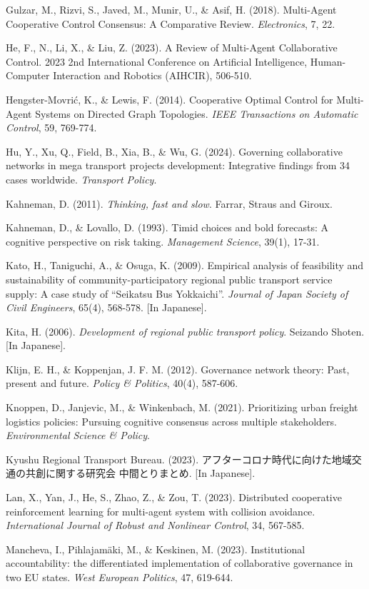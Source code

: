 Gulzar, M., Rizvi, S., Javed, M., Munir, U., \& Asif, H. (2018). Multi-Agent Cooperative Control Consensus: A Comparative Review. \emph{Electronics}, 7, 22.

He, F., N., Li, X., \& Liu, Z. (2023). A Review of Multi-Agent Collaborative Control. 2023 2nd International Conference on Artificial Intelligence, Human-Computer Interaction and Robotics (AIHCIR), 506-510.

Hengster-Movrić, K., \& Lewis, F. (2014). Cooperative Optimal Control for Multi-Agent Systems on Directed Graph Topologies. \emph{IEEE Transactions on Automatic Control}, 59, 769-774.

Hu, Y., Xu, Q., Field, B., Xia, B., \& Wu, G. (2024). Governing collaborative networks in mega transport projects development: Integrative findings from 34 cases worldwide. \emph{Transport Policy}.

Kahneman, D. (2011). \emph{Thinking, fast and slow}. Farrar, Straus and Giroux.

Kahneman, D., \& Lovallo, D. (1993). Timid choices and bold forecasts: A cognitive perspective on risk taking. \emph{Management Science}, 39(1), 17-31.

Kato, H., Taniguchi, A., \& Osuga, K. (2009). Empirical analysis of feasibility and sustainability of community-participatory regional public transport service supply: A case study of ``Seikatsu Bus Yokkaichi''. \emph{Journal of Japan Society of Civil Engineers}, 65(4), 568-578. {[}In Japanese{]}.

Kita, H. (2006). \emph{Development of regional public transport policy}. Seizando Shoten. {[}In Japanese{]}.

Klijn, E. H., \& Koppenjan, J. F. M. (2012). Governance network theory: Past, present and future. \emph{Policy \& Politics}, 40(4), 587-606.

Knoppen, D., Janjevic, M., \& Winkenbach, M. (2021). Prioritizing urban freight logistics policies: Pursuing cognitive consensus across multiple stakeholders. \emph{Environmental Science \& Policy}.

Kyushu Regional Transport Bureau. (2023). アフターコロナ時代に向けた地域交通の共創に関する研究会 中間とりまとめ. {[}In Japanese{]}.

Lan, X., Yan, J., He, S., Zhao, Z., \& Zou, T. (2023). Distributed cooperative reinforcement learning for multi-agent system with collision avoidance. \emph{International Journal of Robust and Nonlinear Control}, 34, 567-585.

Mancheva, I., Pihlajamäki, M., \& Keskinen, M. (2023). Institutional accountability: the differentiated implementation of collaborative governance in two EU states. \emph{West European Politics}, 47, 619-644.

